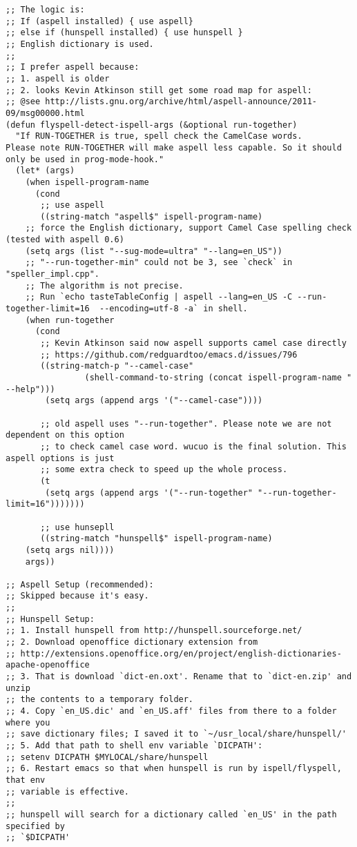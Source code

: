 \documentclass[11pt]{article}
\begin{document}
\begin{verbatim}
;; The logic is:
;; If (aspell installed) { use aspell}
;; else if (hunspell installed) { use hunspell }
;; English dictionary is used.
;;
;; I prefer aspell because:
;; 1. aspell is older
;; 2. looks Kevin Atkinson still get some road map for aspell:
;; @see http://lists.gnu.org/archive/html/aspell-announce/2011-09/msg00000.html
(defun flyspell-detect-ispell-args (&optional run-together)
  "If RUN-TOGETHER is true, spell check the CamelCase words.
Please note RUN-TOGETHER will make aspell less capable. So it should only be used in prog-mode-hook."
  (let* (args)
    (when ispell-program-name
      (cond
       ;; use aspell
       ((string-match "aspell$" ispell-program-name)
	;; force the English dictionary, support Camel Case spelling check (tested with aspell 0.6)
	(setq args (list "--sug-mode=ultra" "--lang=en_US"))
	;; "--run-together-min" could not be 3, see `check` in "speller_impl.cpp".
	;; The algorithm is not precise.
	;; Run `echo tasteTableConfig | aspell --lang=en_US -C --run-together-limit=16  --encoding=utf-8 -a` in shell.
	(when run-together
	  (cond
	   ;; Kevin Atkinson said now aspell supports camel case directly
	   ;; https://github.com/redguardtoo/emacs.d/issues/796
	   ((string-match-p "--camel-case"
			    (shell-command-to-string (concat ispell-program-name " --help")))
	    (setq args (append args '("--camel-case"))))

	   ;; old aspell uses "--run-together". Please note we are not dependent on this option
	   ;; to check camel case word. wucuo is the final solution. This aspell options is just
	   ;; some extra check to speed up the whole process.
	   (t
	    (setq args (append args '("--run-together" "--run-together-limit=16")))))))

       ;; use hunsepll
       ((string-match "hunspell$" ispell-program-name)
	(setq args nil))))
    args))

;; Aspell Setup (recommended):
;; Skipped because it's easy.
;;
;; Hunspell Setup:
;; 1. Install hunspell from http://hunspell.sourceforge.net/
;; 2. Download openoffice dictionary extension from
;; http://extensions.openoffice.org/en/project/english-dictionaries-apache-openoffice
;; 3. That is download `dict-en.oxt'. Rename that to `dict-en.zip' and unzip
;; the contents to a temporary folder.
;; 4. Copy `en_US.dic' and `en_US.aff' files from there to a folder where you
;; save dictionary files; I saved it to `~/usr_local/share/hunspell/'
;; 5. Add that path to shell env variable `DICPATH':
;; setenv DICPATH $MYLOCAL/share/hunspell
;; 6. Restart emacs so that when hunspell is run by ispell/flyspell, that env
;; variable is effective.
;;
;; hunspell will search for a dictionary called `en_US' in the path specified by
;; `$DICPATH'


\end{verbatim}
\end{document}
